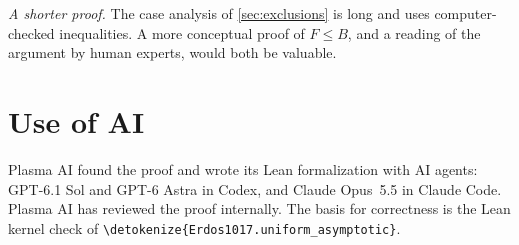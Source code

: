 \documentclass[10pt]{article}
\theoremstyle{definition}
\theoremstyle{remark}
\numberwithin{equation}{section}
\newcommand{\leanid}[1]{\expandafter\nolinkurl\expandafter{\detokenize{#1}}}
\begin{document}
\emph{A shorter proof.} The case analysis of \cref{sec:exclusions} is long and uses computer-checked inequalities. A more conceptual proof of $F\le B$, and a reading of the argument by human experts, would both be valuable.

\section*{Use of AI}
Plasma AI found the proof and wrote its Lean formalization with AI agents: GPT-6.1 Sol and GPT-6 Astra in Codex, and Claude Opus~5.5 in Claude Code. Plasma AI has reviewed the proof internally. The basis for correctness is the Lean kernel check of \leanid{Erdos1017.uniform_asymptotic}.

\end{document}
